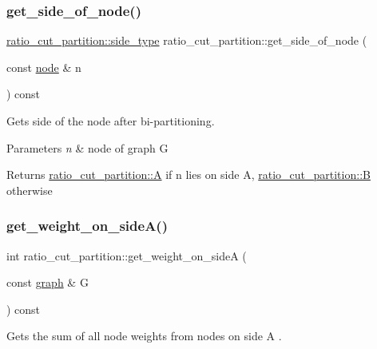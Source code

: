 \subsubsection{\texorpdfstring{get\+\_\+side\+\_\+of\+\_\+node()}{get\_side\_of\_node()}}
{\footnotesize\ttfamily \mbox{\hyperlink{classratio__cut__partition_ace53442bd0c1e21fbf00858ec6f6b456}{ratio\+\_\+cut\+\_\+partition\+::side\+\_\+type}} ratio\+\_\+cut\+\_\+partition\+::get\+\_\+side\+\_\+of\+\_\+node (\begin{DoxyParamCaption}\item[{const \mbox{\hyperlink{classnode}{node}} \&}]{n }\end{DoxyParamCaption}) const}

Gets side of the node after bi-\/partitioning.


\begin{DoxyParams}{Parameters}
{\em n} & node of graph G \\
\hline
\end{DoxyParams}
\begin{DoxyReturn}{Returns}
{\ttfamily \mbox{\hyperlink{classratio__cut__partition_ae1a3cd1c2ede82023f9a229e40909139}{ratio\+\_\+cut\+\_\+partition\+::A}}} if {\ttfamily n} lies on side {\ttfamily A}, {\ttfamily \mbox{\hyperlink{classratio__cut__partition_adf075987228d8adc7950d5b1ba332daa}{ratio\+\_\+cut\+\_\+partition\+::B}}} otherwise 
\end{DoxyReturn}
\mbox{\label{classratio__cut__partition_af68528cd0b199718e6b2f5fe8182e779}} 
\subsubsection{\texorpdfstring{get\+\_\+weight\+\_\+on\+\_\+side\+A()}{get\_weight\_on\_sideA()}}
{\footnotesize\ttfamily int ratio\+\_\+cut\+\_\+partition\+::get\+\_\+weight\+\_\+on\+\_\+sideA (\begin{DoxyParamCaption}\item[{const \mbox{\hyperlink{classgraph}{graph}} \&}]{G }\end{DoxyParamCaption}) const}

Gets the sum of all node weights from nodes on side {\ttfamily A }.


